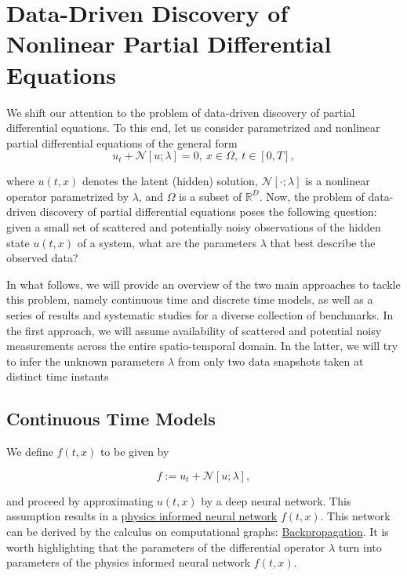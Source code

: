 \documentclass[book.tex]{subfiles}
\begin{document}
\section{Data-Driven Discovery of Nonlinear Partial Differential Equations}

We shift our attention to the problem of data-driven discovery of partial differential equations. To this end, let us consider parametrized and nonlinear partial differential equations of the general form
\begin{equation}
u_t + \mathcal{N}[u;\lambda] = 0,\ x \in \Omega, \ t\in[0,T],    
\end{equation}


where $u(t,x)$ denotes the latent (hidden) solution, $\mathcal{N}[\cdot;\lambda]$ is a nonlinear operator parametrized by $\lambda$, and $\Omega$ is a subset of $\mathbb{R}^D$. Now, the problem of data-driven discovery of partial differential equations poses the following question: given a small set of scattered and potentially noisy observations of the hidden state $u(t,x)$ of a system, what are the parameters $\lambda$ that best describe the observed data?

In what follows, we will provide an overview of the two main approaches to tackle this problem, namely continuous time and discrete time models, as well as a series of results and systematic studies for a diverse collection of benchmarks. In the first approach, we will assume availability of scattered and potential noisy measurements across the entire spatio-temporal domain. In the latter, we will try to infer the unknown parameters $\lambda$ from only two data snapshots taken at distinct time instants

\subsection{Continuous Time Models}
We define $f(t,x)$ to be given by

\begin{equation}
f := u_t + \mathcal{N}[u;\lambda],\label{eq:PDE_RHS}    
\end{equation}



and proceed by approximating $u(t,x)$ by a deep neural network. This assumption results in a \href{https://arxiv.org/abs/1711.10566}{physics informed neural network} $f(t,x)$. This network can be derived by the calculus on computational graphs: \href{http://colah.github.io/posts/2015-08-Backprop/}{Backpropagation}. It is worth highlighting that the parameters of the differential operator $\lambda$ turn into parameters of the physics informed neural network $f(t,x)$.
\end{document}

